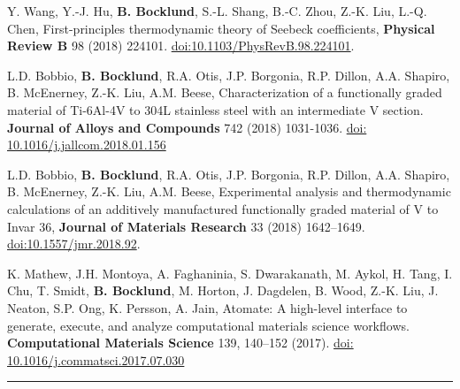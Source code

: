 \documentclass[10pt,letterpaper]{article}
\begin{document}
\begin{itemize*}
\item Y. Wang, Y.-J. Hu, \textbf{B. Bocklund}, S.-L. Shang, B.-C. Zhou, Z.-K. Liu, L.-Q. Chen,
  First-principles thermodynamic theory of Seebeck coefficients,
  \textbf{Physical Review B} 98 (2018) 224101.
  \href{https://doi.org/10.1103/PhysRevB.98.224101}{doi:10.1103/PhysRevB.98.224101}.

\item L.D. Bobbio, \textbf{B. Bocklund}, R.A. Otis, J.P. Borgonia, R.P. Dillon, A.A. Shapiro, B. McEnerney, Z.-K. Liu, A.M. Beese,
  Characterization of a functionally graded material of Ti-6Al-4V to 304L stainless steel with an intermediate V section. \textbf{Journal of Alloys and Compounds} 742 (2018) 1031-1036.
  \href{https://doi.org/10.1016/j.jallcom.2018.01.156}{doi: 10.1016/j.jallcom.2018.01.156}

\item L.D. Bobbio, \textbf{B. Bocklund}, R.A. Otis, J.P. Borgonia, R.P. Dillon, A.A. Shapiro, B. McEnerney, Z.-K. Liu, A.M. Beese,
  Experimental analysis and thermodynamic calculations of an additively manufactured functionally graded material of V to Invar 36,
  \textbf{Journal of Materials Research} 33 (2018) 1642–1649.
  \href{https://doi.org/10.1016/10.1557/jmr.2018.92}{doi:10.1557/jmr.2018.92}.

\item K. Mathew, J.H. Montoya, A. Faghaninia, S. Dwarakanath, M. Aykol,
  H. Tang, I. Chu, T. Smidt, \textbf{B. Bocklund}, M. Horton, J. Dagdelen, B. Wood, Z.-K. Liu, J. Neaton, S.P. Ong, K. Persson, A. Jain,
 Atomate: A high-level interface to generate, execute,
  and analyze computational materials science workflows. \textbf{Computational Materials Science} 139, 140–152 (2017).
  \href{https://doi.org/10.1016/j.commatsci.2017.07.030}{doi: 10.1016/j.commatsci.2017.07.030}

\end{itemize*}



\hrule
\vspace{-0.6em}
\end{document}
